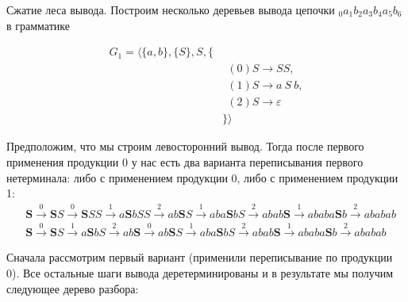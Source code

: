 \begin{example}
  Сжатие леса вывода.
  Построим несколько деревьев вывода цепочки $_0a_1b_2a_3b_4a_5b_6$ в грамматике

  \begin{align*}
   G_1 = \langle \{a,b\}, \{S\},  S, \{ & \\
       & \ \ (0) S \to S S, \\
       & \ \ (1) S \to a \ S \ b, \\
       & \ \ (2) S \to \varepsilon \\
  & \}  \rangle
  \end{align*}

Предположим, что мы строим левосторонний вывод.
Тогда после первого применения продукции 0 у нас есть два варианта переписывания первого нетерминала: либо с применением продукции 0, либо с применением продукции 1:
\begin{align*}
&\textbf{S} \xrightarrow{0} \textbf{S}S \xrightarrow{0} \textbf{S}SS \xrightarrow{1} a\textbf{S}bSS \xrightarrow{2} ab\textbf{S}S \xrightarrow{1} aba\textbf{S}bS \xrightarrow{2} abab\textbf{S} \xrightarrow{1} ababa\textbf{S}b \xrightarrow{2} ababab
\\
&\textbf{S} \xrightarrow{0} \textbf{S}S \xrightarrow{1} a\textbf{S}bS \xrightarrow{2} ab\textbf{S} \xrightarrow{0} ab\textbf{S}S \xrightarrow{1} aba\textbf{S}bS \xrightarrow{2} abab\textbf{S} \xrightarrow{1} ababa\textbf{S}b \xrightarrow{2} ababab
\end{align*}

Сначала рассмотрим первый вариант (применили переписывание по продукции 0).
Все остальные шаги вывода деретерминированы и в результате мы получим следующее дерево разбора:

\begin{center}
\end{center}
\end{example}
